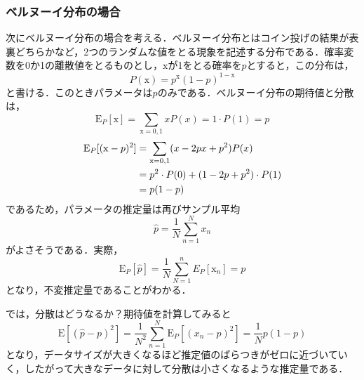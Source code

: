 \documentclass[a4paper,11pt]{jsreport}
\begin{document}
\subsubsection{ベルヌーイ分布の場合}
次にベルヌーイ分布の場合を考える．ベルヌーイ分布とはコイン投げの結果が表裏どちらかなど，2つのランダムな値をとる現象を記述する分布である．確率変数を0か1の離散値をとるものとし，$\mathrm{x}$が1をとる確率を$p$とすると，この分布は，
\begin{equation}
  P(\mathrm{x}) = p^\mathrm{x} (1 - p)^{1-\mathrm{x}}
\end{equation}
と書ける．このときパラメータは$p$のみである．ベルヌーイ分布の期待値と分散は，
\begin{equation}
  \mathrm{E}_{P}[\mathrm{x}] 
  = \sum_{\mathrm{x} = 0,1} x P(x) 
  = 1 \cdot P(1) 
  = p
\end{equation}
\begin{align}
  \mathrm{E}_{P}[(\mathrm{x} - p)^2] 
  &= \sum_{\mathrm{x} = 0,1} (x -2px + p^2) P(x) \notag \\
  &= p^2 \cdot P(0) + (1 - 2p + p^2) \cdot P(1) \notag \\
  &= p(1-p)
\end{align}
であるため，パラメータの推定量は再びサンプル平均
\begin{equation}
  \hat{p} 
  = \frac{1}{N} \sum_{n=1}^N x_n
\end{equation}
がよさそうである．実際，
\begin{equation*}
  \mathrm{E}_{P}[\hat{p}] 
  = \frac{1}{N} \sum_{N=1}^{n} E_P[\mathrm{x}_n]  
  = p
\end{equation*}
となり，不変推定量であることがわかる．\par
では，分散はどうなるか？期待値を計算してみると
\begin{equation}
  \mathrm{E}\left[ (\hat{p} - p)^2 \right]
  = \frac{1}{N^2} \sum_{n=1}^{N} \mathrm{E}_{P} \left[ (x_n - p)^2 \right] 
  = \frac{1}{N} p(1 - p)
\end{equation}
となり，データサイズが大きくなるほど推定値のばらつきがゼロに近づいていく，したがって大きなデータに対して分散は小さくなるような推定量である．
\end{document}
